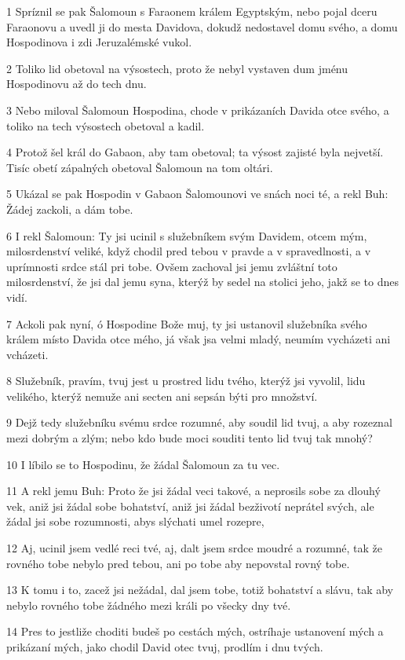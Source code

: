 \par 1 Spríznil se pak Šalomoun s Faraonem králem Egyptským, nebo pojal dceru Faraonovu a uvedl ji do mesta Davidova, dokudž nedostavel domu svého, a domu Hospodinova i zdi Jeruzalémské vukol.
\par 2 Toliko lid obetoval na výsostech, proto že nebyl vystaven dum jménu Hospodinovu až do tech dnu.
\par 3 Nebo miloval Šalomoun Hospodina, chode v prikázaních Davida otce svého, a toliko na tech výsostech obetoval a kadil.
\par 4 Protož šel král do Gabaon, aby tam obetoval; ta výsost zajisté byla nejvetší. Tisíc obetí zápalných obetoval Šalomoun na tom oltári.
\par 5 Ukázal se pak Hospodin v Gabaon Šalomounovi ve snách noci té, a rekl Buh: Žádej zackoli, a dám tobe.
\par 6 I rekl Šalomoun: Ty jsi ucinil s služebníkem svým Davidem, otcem mým, milosrdenství veliké, když chodil pred tebou v pravde a v spravedlnosti, a v uprímnosti srdce stál pri tobe. Ovšem zachoval jsi jemu zvláštní toto milosrdenství, že jsi dal jemu syna, kterýž by sedel na stolici jeho, jakž se to dnes vidí.
\par 7 Ackoli pak nyní, ó Hospodine Bože muj, ty jsi ustanovil služebníka svého králem místo Davida otce mého, já však jsa velmi mladý, neumím vycházeti ani vcházeti.
\par 8 Služebník, pravím, tvuj jest u prostred lidu tvého, kterýž jsi vyvolil, lidu velikého, kterýž nemuže ani secten ani sepsán býti pro množství.
\par 9 Dejž tedy služebníku svému srdce rozumné, aby soudil lid tvuj, a aby rozeznal mezi dobrým a zlým; nebo kdo bude moci souditi tento lid tvuj tak mnohý?
\par 10 I líbilo se to Hospodinu, že žádal Šalomoun za tu vec.
\par 11 A rekl jemu Buh: Proto že jsi žádal veci takové, a neprosils sobe za dlouhý vek, aniž jsi žádal sobe bohatství, aniž jsi žádal bezživotí neprátel svých, ale žádal jsi sobe rozumnosti, abys slýchati umel rozepre,
\par 12 Aj, ucinil jsem vedlé reci tvé, aj, dalt jsem srdce moudré a rozumné, tak že rovného tobe nebylo pred tebou, ani po tobe aby nepovstal rovný tobe.
\par 13 K tomu i to, zacež jsi nežádal, dal jsem tobe, totiž bohatství a slávu, tak aby nebylo rovného tobe žádného mezi králi po všecky dny tvé.
\par 14 Pres to jestliže choditi budeš po cestách mých, ostríhaje ustanovení mých a prikázaní mých, jako chodil David otec tvuj, prodlím i dnu tvých.
